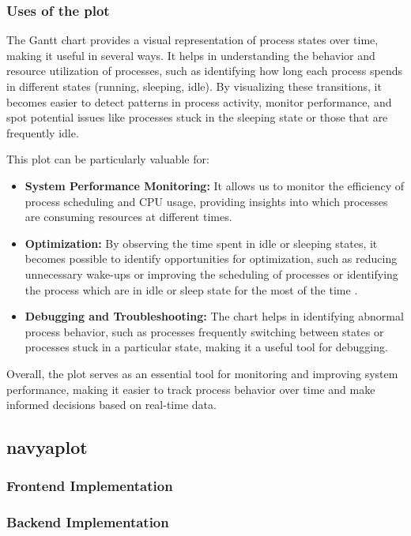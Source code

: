 \documentclass[12pt]{article}
\begin{document}
\subsubsection{Uses of the plot}
The Gantt chart provides a visual representation of process states over time, making it useful in several ways. It helps in understanding the behavior and resource utilization of processes, such as identifying how long each process spends in different states (running, sleeping, idle). By visualizing these transitions, it becomes easier to detect patterns in process activity, monitor performance, and spot potential issues like processes stuck in the sleeping state or those that are frequently idle. 

This plot can be particularly valuable for:
\begin{itemize}
    \item \textbf{System Performance Monitoring:} It allows us to monitor the efficiency of process scheduling and CPU usage, providing insights into which processes are consuming resources at different times.
    \item \textbf{Optimization:} By observing the time spent in idle or sleeping states, it becomes possible to identify opportunities for optimization, such as reducing unnecessary wake-ups or improving the scheduling of processes or identifying the process which are in idle or sleep state for the most of the time .
    \item \textbf{Debugging and Troubleshooting:} The chart helps in identifying abnormal process behavior, such as processes frequently switching between states or processes stuck in a particular state, making it a useful tool for debugging.
\end{itemize}
Overall, the plot serves as an essential tool for monitoring and improving system performance, making it easier to track process behavior over time and make informed decisions based on real-time data.

\subsection{navyaplot}
\subsubsection{Frontend Implementation}
\subsubsection{Backend Implementation}
\end{document}
